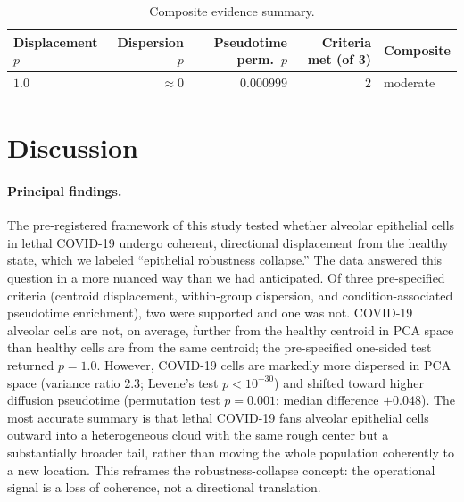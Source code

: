 \documentclass[11pt]{article}
\begin{document}
\begin{table}[H]
\centering
\begin{tabular}{lrrrl}
\toprule
Displacement $p$ & Dispersion $p$ & Pseudotime perm.\ $p$ & Criteria met (of 3) & Composite \\
\midrule
$1.0$ & $\approx 0$ & $0.000999$ & $2$ & moderate \\
\bottomrule
\end{tabular}
\caption{Composite evidence summary.}
\label{tab:tab3}
\end{table}

\section{Discussion}

\paragraph{Principal findings.} The pre-registered framework of this study tested whether alveolar epithelial cells in lethal COVID-19 undergo coherent, directional displacement from the healthy state, which we labeled ``epithelial robustness collapse.'' The data answered this question in a more nuanced way than we had anticipated. Of three pre-specified criteria (centroid displacement, within-group dispersion, and condition-associated pseudotime enrichment), two were supported and one was not. COVID-19 alveolar cells are not, on average, further from the healthy centroid in PCA space than healthy cells are from the same centroid; the pre-specified one-sided test returned $p = 1.0$. However, COVID-19 cells are markedly more dispersed in PCA space (variance ratio 2.3; Levene's test $p < 10^{-30}$) and shifted toward higher diffusion pseudotime (permutation test $p = 0.001$; median difference $+0.048$). The most accurate summary is that lethal COVID-19 fans alveolar epithelial cells outward into a heterogeneous cloud with the same rough center but a substantially broader tail, rather than moving the whole population coherently to a new location. This reframes the robustness-collapse concept: the operational signal is a loss of coherence, not a directional translation.
\end{document}
